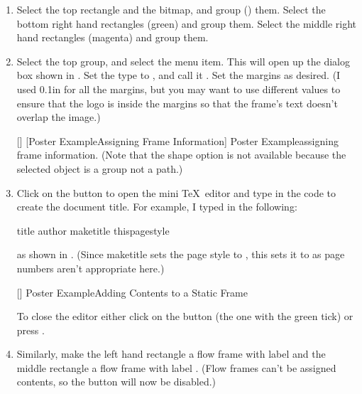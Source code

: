 \begin{enumerate}
\FloatFig
{fig:poster4}
[]
{}
{Poster Example\dash Adding Some Paint}

\item Select the top rectangle and the \gls{bitmap}, and
\gls{group} () them.
Select the bottom right hand rectangles (green) and group them.
Select the middle right hand rectangles (magenta) and group them.

\item Select the top group, and select the
 menu item. This will
open up the  dialog box shown in .
Set the type to , and call it . Set the
margins as desired. (I used 0.1in for all the margins, but you
may want to use different values to ensure that the logo is inside
the margins so that the frame's text doesn't overlap the image.)

[]
{}
[Poster Example\dash Assigning Frame Information]
{Poster Example\dash assigning frame information. (Note that
the shape option is not available because the selected object is
a group not a path.)}

\item Click on the  button to open
the mini \TeX\ editor and type in the code to create the document
title. For example, I typed in the following:
\begin{compactcodebox*}
\gls{title}
\gls{author}
\gls{maketitle}
\gls{thispagestyle}
\end{compactcodebox*}
as shown in . (Since
\gls{maketitle} sets the page style to , this sets
it to  as page numbers aren't appropriate here.)

[]
{}
{Poster Example\dash Adding Contents to a Static Frame}

To close the editor either click on the 
button (the one with the green tick) or press 
.

\item Similarly, make the left hand rectangle a flow frame
with label  and the middle rectangle a flow frame with label
. (Flow frames can't be assigned contents, so the
 button will now be disabled.)


\end{enumerate}
